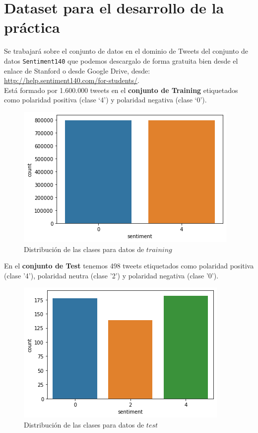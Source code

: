 \documentclass[a4paper,12pt]{report}
\begin{document}
\section{Dataset para el desarrollo de la práctica}

{\setlength{\parindent}{0cm}
Se trabajará sobre el conjunto de datos en el dominio de Tweets del conjunto de datos \texttt{Sentiment140} que podemos descargalo de forma gratuita bien desde el enlace de Stanford o desde Google Drive, desde: \url{http://help.sentiment140.com/for-students/}. }
\vspace{2mm}\\
Está formado por 1.600.000 tweets en el \textbf{conjunto de Training} etiquetados como polaridad positiva (clase ‘4’) y polaridad negativa (clase ‘0’). 

\begin{figure}[htbp!]
\begin{center}
\includegraphics[scale=0.55]{images/train.png}
\end{center}
\caption{Distribución de las clases para datos de $training$}
\end{figure}

\vspace{2mm}
{\setlength{\parindent}{0cm}
En el \textbf{conjunto de Test} tenemos 498 tweets etiquetados como polaridad positiva (clase '4'), polaridad neutra (clase '2') y polaridad negativa (clase '0').}

\begin{figure}[htbp!]
\begin{center}
\includegraphics[scale=0.6]{images/test.png}
\end{center}
\caption{Distribución de las clases para datos de $test$}
\end{figure}
\end{document}
